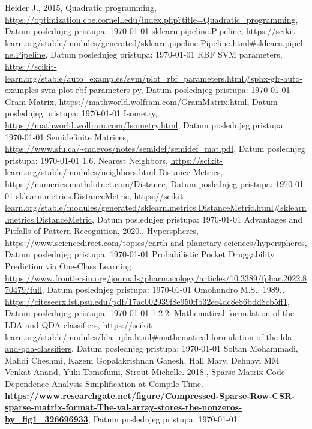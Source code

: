 \documentclass[fontsize=12bp, paper=a4]{scrarticle}
\begin{document}
\begin{thebibliography}{1}
    Heider J., 2015, Quadratic programming, \url{https://optimization.cbe.cornell.edu/index.php?title=Quadratic_programming}, Datum poslednjeg pristupa: \today
    sklearn.pipeline.Pipeline, \url{ https://scikit-learn.org/stable/modules/generated/sklearn.pipeline.Pipeline.html#sklearn.pipeline.Pipeline}, Datum poslednjeg pristupa: \today
    RBF SVM parameters, \url{https://scikit-learn.org/stable/auto_examples/svm/plot_rbf_parameters.html#sphx-glr-auto-examples-svm-plot-rbf-parameters-py}, Datum poslednjeg pristupa: \today
    Gram Matrix, \url{https://mathworld.wolfram.com/GramMatrix.html}, Datum poslednjeg pristupa: \today
    Isometry, \url{https://mathworld.wolfram.com/Isometry.html}, Datum poslednjeg pristupa: \today
    Semidefinite Matrices, \url{https://www.sfu.ca/~mdevos/notes/semidef/semidef_mat.pdf}, Datum poslednjeg pristupa: \today
    1.6. Nearest Neighbors, \url{https://scikit-learn.org/stable/modules/neighbors.html}
    Distance Metrics, \url{https://numerics.mathdotnet.com/Distance}, Datum poslednjeg pristupa: \today
    sklearn.metrics.DistanceMetric, \url{https://scikit-learn.org/stable/modules/generated/sklearn.metrics.DistanceMetric.html#sklearn.metrics.DistanceMetric}, Datum poslednjeg pristupa: \today
    Advantages and Pitfalls of Pattern Recognition, 2020., Hyperspheres, \url{https://www.sciencedirect.com/topics/earth-and-planetary-sciences/hyperspheres}, Datum poslednjeg pristupa: \today
    Probabilistic Pocket Druggability Prediction via One-Class Learning, \url{https://www.frontiersin.org/journals/pharmacology/articles/10.3389/fphar.2022.870479/full}, Datum poslednjeg pristupa: \today
    Omohundro M.S., 1989., 
    \url{https://citeseerx.ist.psu.edu/pdf/17ac002939f8e950ffb32ec4dc8e86bdd8cb5ff1}, Datum poslednjeg pristupa: \today
    1.2.2. Mathematical formulation of the LDA and QDA classifiers, \url{https://scikit-learn.org/stable/modules/lda_qda.html#mathematical-formulation-of-the-lda-and-qda-classifiers}, Datum poslednjeg pristupa: \today
    Soltan Mohammadi, Mahdi Cheshmi, Kazem Gopalakrishnan Ganesh, Hall Mary, Dehnavi MM Venkat Anand, Yuki Tomofumi, Strout Michelle. 2018., Sparse Matrix Code Dependence Analysis Simplification at Compile Time.  \textbf{\url{https://www.researchgate.net/figure/Compressed-Sparse-Row-CSR-sparse-matrix-format-The-val-array-stores-the-nonzeros-by_fig1_326696933}}, Datum poslednjeg pristupa: \today

\end{thebibliography}
\end{document}
